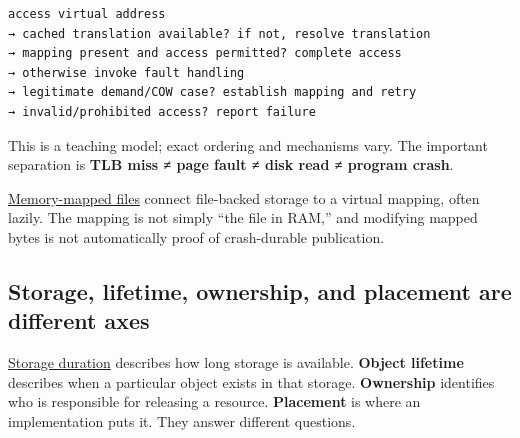 \begin{verbatim}
access virtual address
→ cached translation available? if not, resolve translation
→ mapping present and access permitted? complete access
→ otherwise invoke fault handling
→ legitimate demand/COW case? establish mapping and retry
→ invalid/prohibited access? report failure
\end{verbatim}

This is a teaching model; exact ordering and mechanisms vary. The important separation is \textbf{TLB miss ≠ page fault ≠ disk read ≠ program crash}.

\hyperref[appendix-313ee7a0ba7b]{Memory-mapped files} connect file-backed storage to a virtual mapping, often lazily. The mapping is not simply ``the file in RAM,'' and modifying mapped bytes is not automatically proof of crash-durable publication.

\subsection{Storage, lifetime, ownership, and placement are different axes}\label{01-foundations-i-ch002-storage-lifetime-ownership-and-placement-are-different-axes}

\hyperref[appendix-0b104bcba06b]{Storage duration} describes how long storage is available. \textbf{Object lifetime} describes when a particular object exists in that storage. \textbf{Ownership} identifies who is responsible for releasing a resource. \textbf{Placement} is where an implementation puts it. They answer different questions.

